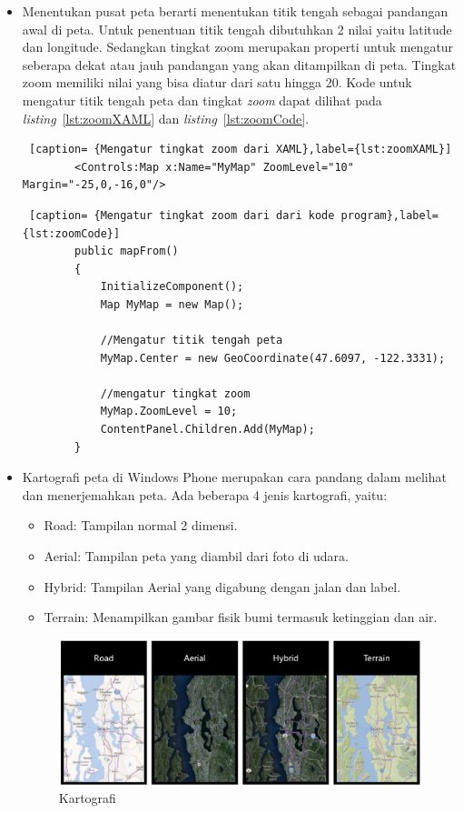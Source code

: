 \begin{itemize}
	\item Menentukan pusat peta berarti menentukan titik tengah sebagai pandangan awal di peta. Untuk penentuan titik tengah dibutuhkan 2 nilai yaitu latitude dan longitude. Sedangkan tingkat zoom merupakan properti untuk mengatur seberapa dekat atau jauh pandangan yang akan ditampilkan di peta. Tingkat zoom memiliki nilai yang bisa diatur dari satu hingga 20. Kode untuk mengatur titik tengah peta dan tingkat \textit{zoom} dapat dilihat pada \textit{listing}~\ref{lst:zoomXAML} dan \textit{listing}~\ref{lst:zoomCode}.\\
	
	\begin{lstlisting} [caption= {Mengatur tingkat zoom dari XAML},label={lst:zoomXAML}]
		<Controls:Map x:Name="MyMap" ZoomLevel="10" Margin="-25,0,-16,0"/>
	\end{lstlisting}

	\begin{lstlisting} [caption= {Mengatur tingkat zoom dari dari kode program},label={lst:zoomCode}]
		public mapFrom()
		{
			InitializeComponent();
			Map MyMap = new Map();

			//Mengatur titik tengah peta
			MyMap.Center = new GeoCoordinate(47.6097, -122.3331);

			//mengatur tingkat zoom
			MyMap.ZoomLevel = 10;
			ContentPanel.Children.Add(MyMap);
		}
	\end{lstlisting}

	
	\item Kartografi peta di Windows Phone merupakan cara pandang dalam melihat dan menerjemahkan peta. Ada beberapa 4 jenis kartografi, yaitu:
		
		\begin{itemize}
			\item Road: Tampilan normal 2 dimensi.
			\item Aerial: Tampilan peta yang diambil dari foto di udara.
			\item Hybrid: Tampilan Aerial yang digabung dengan jalan dan label.
			\item Terrain: Menampilkan gambar fisik bumi termasuk ketinggian dan air.
		\end{itemize}
		
		\begin{figure}[h]
			\centering
				\includegraphics[scale=0.4]{Gambar/kartografi}
			\caption{Kartografi}
			\label{fig:Kartografi}
		\end{figure}
		

\end{itemize}
